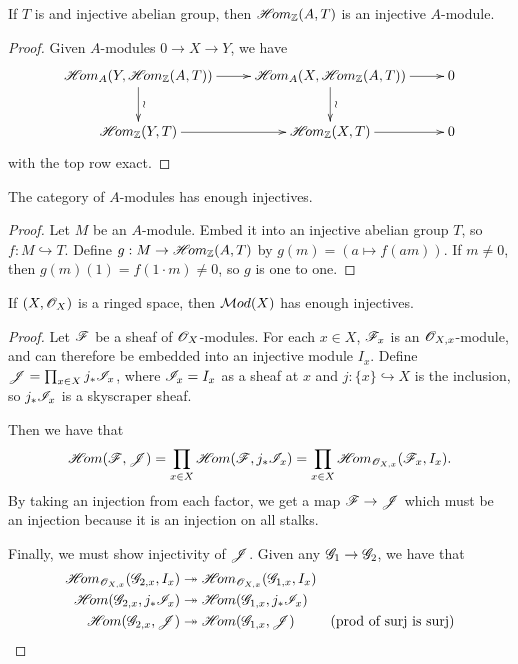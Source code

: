 \begin{lemma}
If $T$ is and injective abelian group, then $\mathscr{H}\!om_{\mathbb{Z}}(A,T)$ is an
injective $A$-module.
\end{lemma}
\begin{proof}
Given $A$-modules $0\to X\to Y$, we have \[\xymatrix{
    \Hom_A(Y,\Hom_{\Z}(A,T)) \ar[r] \ar[d]^{\wr} & \Hom_A(X,\Hom_{\Z}(A,T))
    \ar[r] \ar[d]^{\wr} & 0\\
    \Hom_{\Z}(Y,T)\ar[r] & \Hom_{\Z}(X,T) \ar[r] & 0
}\] with the top row exact.
\end{proof}

\begin{theorem}
The category of $A$-modules has enough injectives.
\end{theorem}
\begin{proof}
Let $M$ be an $A$-module.  Embed it into an injective abelian
group $T$, so $f:M\hookrightarrow T$.  Define $g:M\to
\mathscr{H}\!om_{\mathbb{Z}}(A,T)$ by $g(m)=(a\mapsto f(am))$.  If $m\not=0$, then
$g(m)(1)=f(1\cdot m)\not=0$, so $g$ is one to one.
\end{proof}

\begin{theorem}
If $(X,\mathscr{O}_X)$ is a ringed space, then $\mathcal{M}od(X)$ has enough
injectives.
\end{theorem}
\begin{proof}
Let $\mathscr{F}$ be a sheaf of $\mathscr{O}_X$-modules.  For each $x\in X$, $\mathscr{F}_x$
is an $\mathscr{O}_{X,x}$-module, and can therefore be embedded into an
injective module $I_x$.  Define $\mathscr{J} = \prod_{x\in X}j_*\mathscr{I}_x$,
where $\mathscr{I}_x=I_x$ as a sheaf at $x$ and $j:\{x\}\hookrightarrow X$
is the inclusion, so $j_*\mathscr{I}_x$ is a skyscraper sheaf.

Then we have that
\[
 \mathscr{H}\!om(\mathscr{F},\mathscr{J}) = \prod_{x\in X} \mathscr{H}\!om(\mathscr{F},j_*\mathscr{I}_x) = \prod_{x\in
 X}\mathscr{H}\!om_{\mathscr{O}_{X,x}}(\mathscr{F}_x,I_x).
\]
By taking an injection from each factor, we get a map $\mathscr{F}\to \mathscr{J}$
which must be an injection because it is an injection on all
stalks.

Finally, we must show injectivity of $\mathscr{J}$.  Given any $\mathscr{G}_1\to
\mathscr{G}_2$, we have that
\begin{align*}
 \mathscr{H}\!om_{\mathscr{O}_{X,x}}(\mathscr{G}_{2,x},I_x) &\twoheadrightarrow
 \mathscr{H}\!om_{\mathscr{O}_{X,x}}(\mathscr{G}_{1,x},I_x) \\
 \mathscr{H}\!om(\mathscr{G}_{2,x},j_*\mathscr{I}_x) &\twoheadrightarrow
 \mathscr{H}\!om(\mathscr{G}_{1,x},j_*\mathscr{I}_x) \\
 \mathscr{H}\!om(\mathscr{G}_{2,x},\mathscr{J}) &\twoheadrightarrow
 \mathscr{H}\!om(\mathscr{G}_{1,x},\mathscr{J}) & \text{(prod of surj is surj)} \\
\end{align*}
\end{proof}

